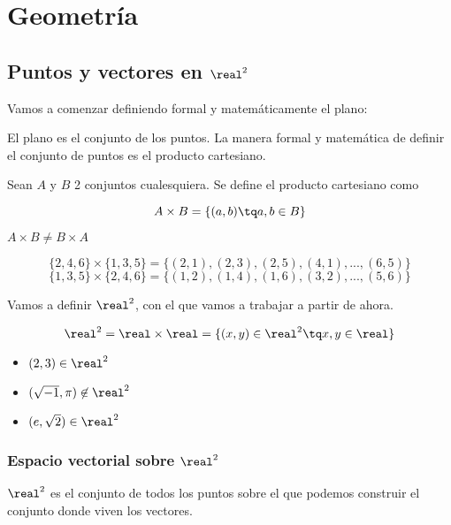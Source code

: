 
\chapter{Geometría}

\section{Puntos y vectores en $\real^2$}

Vamos a comenzar definiendo formal y matemáticamente el plano:

El plano es el conjunto de los puntos. La manera formal y matemática de definir el conjunto de puntos es el producto cartesiano.

\begin{defn}
Sean $A$ y $B$ 2 conjuntos cualesquiera. Se define el producto cartesiano como

\[
	A\times B = \left\{ (a,b) \tq a,b\in B \right\}
\]
\end{defn}

\obs $A\times B \neq B\times A$

\begin{example}
\[\{2,4,6\}\times \{1,3,5\} = \{(2,1),(2,3),(2,5),(4,1),...,(6,5)\}\]
\[\{1,3,5\}\times \{2,4,6\} = \{(1,2),(1,4),(1,6),(3,2),...,(5,6)\}\]
\end{example}

Vamos a definir $\real^2$, con el que vamos a trabajar a partir de ahora. 

\[\real^2 = \real\times\real = \{ (x,y)\in\real^2 \tq x,y\in\real\}\]

\begin{example}
	\begin{itemize}
		\item $(2,3)\in\real^2$
		\item $(\sqrt{-1},\pi)\not\in\real^2$
		\item $(e,\sqrt{2})\in\real^2$
	\end{itemize}
\end{example}


\subsection{Espacio vectorial sobre $\real^2$}

$\real^2$ es el conjunto de todos los puntos sobre el que podemos construir el conjunto donde viven los vectores.

